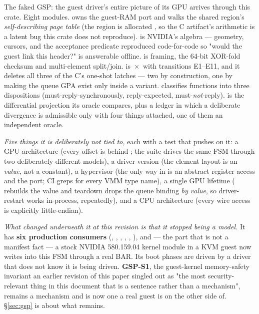 \documentclass[10.5pt]{article}
\begin{document}
The faked GSP: the guest driver's entire picture of its GPU arrives through this crate. Eight
modules.  owns the guest-RAM port and walks the shared region's \emph{self-describing
page table} (the region is allocated , so the C artifact's
 arithmetic is a latent bug this crate does not reproduce).  is
NVIDIA's  algebra — geometry, cursors, and the  acceptance predicate
reproduced code-for-code so "would the guest link this header?" is answerable offline.
 is framing, the 64-bit XOR-fold checksum and multi-element split/join.
 is \,$\times$\, with transitions E1--E11, and it
deletes all three of the C's one-shot latches — two by construction, one by making the queue
GPA exist only inside a  variant.  classifies functions into three
dispositions (must-reply-synchronously, reply-expected, must-\emph{not}-reply).  is
the differential projection its oracle compares, plus a ledger in which a deliberate divergence
is admissible only with four things attached, one of them an independent oracle.

\emph{Five things it is deliberately not tied to,} each with a test that pushes on it: a GPU
architecture (every offset is behind ; the suite drives the same FSM
through two deliberately-different models), a driver version (the element layout is an
 \emph{value}, not a constant), a hypervisor (the only way in is an abstract
register access and the  port; CI greps for every VMM type name), a single GPU
lifetime ( rebuilds the value and teardown drops the queue binding
\emph{by value}, so driver-restart works in-process, repeatedly), and a CPU architecture (every
wire access is explicitly little-endian).

\emph{What changed underneath it at this revision is that it stopped being a model.} It has
\textbf{six production consumers} (, , ,
, , ), and — the part that is not a manifest fact — a
stock NVIDIA 580.159.04 kernel module in a KVM guest now writes into this FSM through a real BAR.
Its boot phases are driven by a driver that does not know it is being driven. \textbf{GSP-S1},
the guest-kernel memory-safety invariant an earlier revision of this paper singled out as "the
most security-relevant thing in this document that is a sentence rather than a mechanism",
remains a mechanism and is now one a real guest is on the other side of. \S\ref{sec:gsp} is about
what remains.
\end{document}
